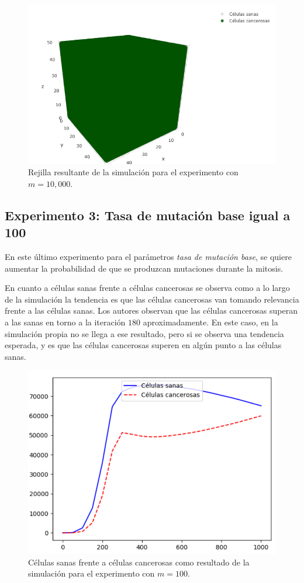 \begin{figure}[h]
\centering
\includegraphics[scale=0.6]{figures/experiments/exp2/grid}
\caption{Rejilla resultante de la simulación para el experimento con $m = 10,000$.}
\end{figure}

\subsection{Experimento 3: Tasa de mutación base igual a 100}

En este último experimento para el parámetros \textit{tasa de mutación base}, se
quiere aumentar la probabilidad de que se produzcan mutaciones durante la mitosis.

En cuanto a células sanas frente a células cancerosas se observa como a lo largo de la simulación la
tendencia es que las células cancerosas van tomando relevancia frente a las células sanas. Los autores
observan que las células cancerosas superan a las sanas en torno a la iteración $180$ aproximadamente.
En este caso, en la simulación propia no se llega a ese resultado, pero si se observa una tendencia esperada,
y es que las células cancerosas superen en algún punto a las células sanas.

\begin{figure}[h]
\centering
\includegraphics[scale=0.8]{figures/experiments/exp3/healthvscarcino}
\caption{Células sanas frente a células cancerosas como resultado de la simulación para el experimento con $m = 100$.}
\end{figure}

